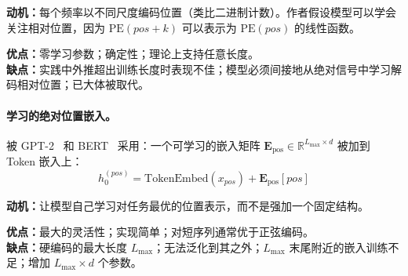 \textbf{动机：}每个频率以不同尺度编码位置（类比二进制计数）。作者假设模型可以学会关注相对位置，因为 $\text{PE}(pos+k)$ 可以表示为 $\text{PE}(pos)$ 的线性函数。

\textbf{优点：}零学习参数；确定性；理论上支持任意长度。\\

\textbf{缺点：}实践中外推超出训练长度时表现不佳；模型必须间接地从绝对信号中学习解码相对位置；已大体被取代。

\paragraph{学习的绝对位置嵌入。}
\label{learned-absolute-positional-embedding.}

被 GPT-2~\cite{radford2019gpt2} 和 BERT~\cite{devlin2019bert} 采用：一个可学习的嵌入矩阵 $\mathbf{E}_{\text{pos}} \in \mathbb{R}^{L_{\max} \times d}$ 被加到 Token 嵌入上：
\[
h_0^{(pos)} = \text{TokenEmbed}(x_{pos}) + \mathbf{E}_{\text{pos}}[pos]
\]

\textbf{动机：}让模型自己学习对任务最优的位置表示，而不是强加一个固定结构。

\textbf{优点：}最大的灵活性；实现简单；对短序列通常优于正弦编码。\\

\textbf{缺点：}硬编码的最大长度 $L_{\max}$；无法泛化到其之外；$L_{\max}$ 末尾附近的嵌入训练不足；增加 $L_{\max} \times d$ 个参数。

